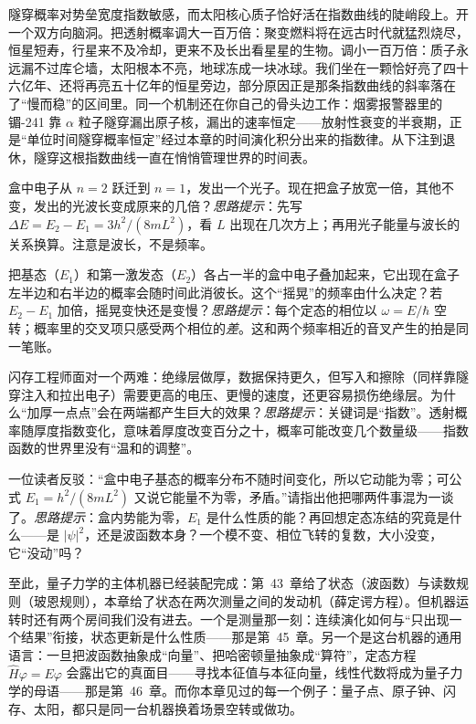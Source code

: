 \begin{thought}[给太阳拧一拧隧穿的旋钮]
隧穿概率对势垒宽度指数敏感，而太阳核心质子恰好活在指数曲线的陡峭段上。开一个双方向脑洞。把透射概率调大一百万倍：聚变燃料将在远古时代就猛烈烧尽，恒星短寿，行星来不及冷却，更来不及长出看星星的生物。调小一百万倍：质子永远漏不过库仑墙，太阳根本不亮，地球冻成一块冰球。我们坐在一颗恰好亮了四十六亿年、还将再亮五十亿年的恒星旁边，部分原因正是那条指数曲线的斜率落在了“慢而稳”的区间里。同一个机制还在你自己的骨头边工作：烟雾报警器里的镅-241 靠 \(\alpha\) 粒子隧穿漏出原子核，漏出的速率恒定——放射性衰变的半衰期，正是“单位时间隧穿概率恒定”经过本章的时间演化积分出来的指数律。从下注到退休，隧穿这根指数曲线一直在悄悄管理世界的时间表。
\end{thought}

\begin{puzzles}
\item 盒中电子从 \(n=2\) 跃迁到 \(n=1\)，发出一个光子。现在把盒子放宽一倍，其他不变，发出的光波长变成原来的几倍？\emph{思路提示}：先写 \(\Delta E=E_{2}-E_{1}=3h^{2}/(8mL^{2})\)，看 \(L\) 出现在几次方上；再用光子能量与波长的关系换算。注意是波长，不是频率。
\item 把基态（\(E_{1}\)）和第一激发态（\(E_{2}\)）各占一半的盒中电子叠加起来，它出现在盒子左半边和右半边的概率会随时间此消彼长。这个“摇晃”的频率由什么决定？若 \(E_{2}-E_{1}\) 加倍，摇晃变快还是变慢？\emph{思路提示}：每个定态的相位以 \(\omega=E/\hbar\) 空转；概率里的交叉项只感受两个相位的\emph{差}。这和两个频率相近的音叉产生的拍是同一笔账。
\item 闪存工程师面对一个两难：绝缘层做厚，数据保持更久，但写入和擦除（同样靠隧穿注入和拉出电子）需要更高的电压、更慢的速度，还更容易损伤绝缘层。为什么“加厚一点点”会在两端都产生巨大的效果？\emph{思路提示}：关键词是“指数”。透射概率随厚度指数变化，意味着厚度改变百分之十，概率可能改变几个数量级——指数函数的世界里没有“温和的调整”。
\item 一位读者反驳：“盒中电子基态的概率分布不随时间变化，所以它动能为零；可公式 \(E_{1}=h^{2}/(8mL^{2})\) 又说它能量不为零，矛盾。”请指出他把哪两件事混为一谈了。\emph{思路提示}：盒内势能为零，\(E_{1}\) 是什么性质的能？再回想定态冻结的究竟是什么——是 \(|\psi|^{2}\)，还是波函数本身？一个模不变、相位飞转的复数，大小没变，它“没动”吗？
\end{puzzles}

至此，量子力学的主体机器已经装配完成：第~43~章给了状态（波函数）与读数规则（玻恩规则），本章给了状态在两次测量之间的发动机（薛定谔方程）。但机器运转时还有两个房间我们没有进去。一个是测量那一刻：连续演化如何与“只出现一个结果”衔接，状态更新是什么性质——那是第~45~章。另一个是这台机器的通用语言：一旦把波函数抽象成“向量”、把哈密顿量抽象成“算符”，定态方程 \(\hat{H}\varphi=E\varphi\) 会露出它的真面目——寻找本征值与本征向量，线性代数将成为量子力学的母语——那是第~46~章。而你本章见过的每一个例子：量子点、原子钟、闪存、太阳，都只是同一台机器换着场景空转或做功。
